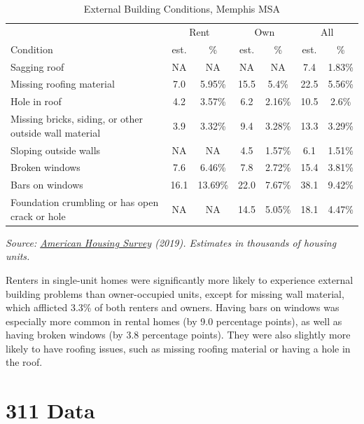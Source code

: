 \documentclass[
]{book}
\begin{document}
\begin{table}

\caption{\label{tab:unnamed-chunk-7}External Building Conditions, Memphis MSA}
\centering
\begin{tabular}[t]{l|c|c|c|c|c|c}
\hline
\multicolumn{1}{c|}{ } & \multicolumn{2}{c|}{Rent} & \multicolumn{2}{c|}{Own} & \multicolumn{2}{c}{All} \\
\cline{2-3} \cline{4-5} \cline{6-7}
Condition & est. & \% & est. & \% & est. & \%\\
\hline
Sagging roof & NA & NA & NA & NA & 7.4 & 1.83\%\\
\hline
Missing roofing material & 7.0 & 5.95\% & 15.5 & 5.4\% & 22.5 & 5.56\%\\
\hline
Hole in roof & 4.2 & 3.57\% & 6.2 & 2.16\% & 10.5 & 2.6\%\\
\hline
Missing bricks, siding, or other outside wall material & 3.9 & 3.32\% & 9.4 & 3.28\% & 13.3 & 3.29\%\\
\hline
Sloping outside walls & NA & NA & 4.5 & 1.57\% & 6.1 & 1.51\%\\
\hline
Broken windows & 7.6 & 6.46\% & 7.8 & 2.72\% & 15.4 & 3.81\%\\
\hline
Bars on windows & 16.1 & 13.69\% & 22.0 & 7.67\% & 38.1 & 9.42\%\\
\hline
Foundation crumbling or has open crack or hole & NA & NA & 14.5 & 5.05\% & 18.1 & 4.47\%\\
\hline
\end{tabular}
\end{table}

\emph{Source: \href{https://www.census.gov/newsroom/press-releases/2020/2019-american-housing-survey.html}{American Housing Survey} (2019). Estimates in thousands of housing units.}

Renters in single-unit homes were significantly more likely to experience external building problems than owner-occupied units, except for missing wall material, which afflicted 3.3\% of both renters and owners. Having bars on windows was especially more common in rental homes (by 9.0 percentage points), as well as having broken windows (by 3.8 percentage points). They were also slightly more likely to have roofing issues, such as missing roofing material or having a hole in the roof.

\hypertarget{data}{%
\chapter{311 Data}\label{data}}
\end{document}
